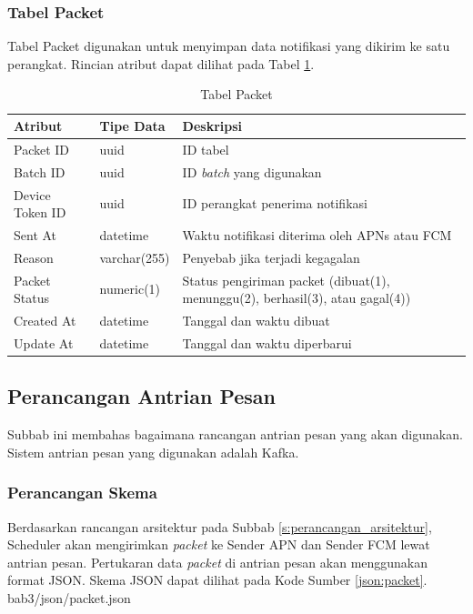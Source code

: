\subsubsection{Tabel Packet} \label{s:tabel_packet}
\par Tabel Packet digunakan untuk menyimpan data notifikasi yang dikirim ke satu perangkat. Rincian atribut dapat dilihat pada Tabel \ref{tabel_packet}.
\begin{longtable}{|p{2cm}|p{2.5cm}|p{4.5cm}|}
	\caption{Tabel Packet} \label{tabel_packet} \\ \hline
	\rowcolor{lightgray} {Atribut} & {Tipe Data} & {Deskripsi} \\ \hline
	\endhead
	Packet ID & uuid & ID tabel \\ \hline
	Batch ID & uuid & ID \textit{batch} yang digunakan \\ \hline
	Device Token ID & uuid & ID perangkat penerima notifikasi \\ \hline
	Sent At & datetime & Waktu notifikasi diterima oleh APNs atau FCM \\ \hline
	Reason & varchar(255) & Penyebab jika terjadi kegagalan \\ \hline
	Packet Status & numeric(1) & Status pengiriman packet (dibuat(1), menunggu(2), berhasil(3), atau gagal(4)) \\ \hline
	Created At & datetime & Tanggal dan waktu dibuat \\ \hline
	Update At & datetime & Tanggal dan waktu diperbarui \\ \hline
\end{longtable}

\subsection{Perancangan Antrian Pesan}
\par Subbab ini membahas bagaimana rancangan antrian pesan yang akan digunakan. Sistem antrian pesan yang digunakan adalah Kafka.

\subsubsection{Perancangan Skema}
\par Berdasarkan rancangan arsitektur pada Subbab \ref{s:perancangan_arsitektur}, Scheduler akan mengirimkan \textit{packet} ke Sender APN dan Sender FCM lewat antrian pesan. Pertukaran data \textit{packet} di antrian pesan akan menggunakan format JSON. Skema JSON dapat dilihat pada Kode Sumber \ref{json:packet}.
\clearpage
 {bab3/json/packet.json}

